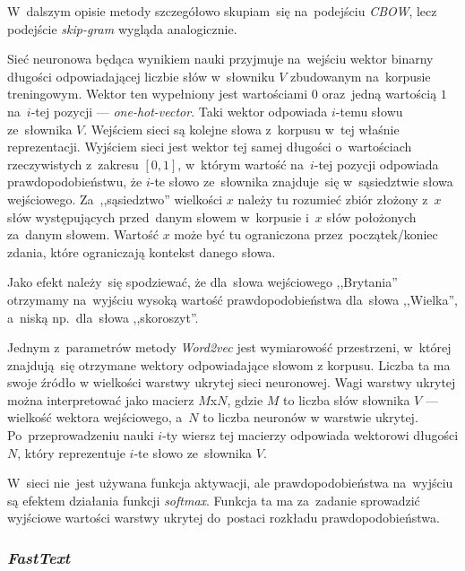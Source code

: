 \documentclass[pl]{minipw} %
\begin{document}
W~dalszym opisie metody szczegółowo skupiam~się na~podejściu \textit{CBOW}, lecz podejście \textit{skip-gram} wygląda analogicznie.

Sieć neuronowa będąca wynikiem nauki przyjmuje na~wejściu wektor binarny długości odpowiadającej liczbie słów w~słowniku $V$ zbudowanym na~korpusie treningowym. Wektor ten wypełniony jest wartościami $0$ oraz~jedną wartością $1$ na~$i$-tej pozycji --- \textit{one-hot-vector}. Taki wektor odpowiada $i$-temu słowu ze~słownika $V$. Wejściem sieci są kolejne słowa z~korpusu w~tej właśnie reprezentacji. Wyjściem sieci jest wektor tej samej długości o~wartościach rzeczywistych z~zakresu $[0,1]$, w~którym wartość na~$i$-tej pozycji odpowiada prawdopodobieństwu, że $i$-te słowo ze~słownika znajduje~się w~sąsiedztwie słowa wejściowego. Za~,,sąsiedztwo'' wielkości $x$ należy tu rozumieć zbiór złożony z~$x$ słów występujących przed~danym słowem w~korpusie i~$x$ słów położonych za~danym słowem. Wartość $x$ może być tu ograniczona przez~początek/koniec zdania, które ograniczają kontekst danego słowa.

Jako efekt należy~się spodziewać, że dla~słowa wejściowego ,,Brytania'' otrzymamy na~wyjściu wysoką wartość prawdopodobieństwa dla~słowa ,,Wielka'', a~niską np.~dla~słowa ,,skoroszyt''.

Jednym z~parametrów metody \textit{Word2vec} jest wymiarowość przestrzeni, w~której znajdują~się otrzymane wektory odpowiadające słowom z korpusu. Liczba ta ma swoje źródło w wielkości warstwy ukrytej sieci neuronowej. Wagi warstwy ukrytej można interpretować jako macierz $M$x$N$, gdzie $M$ to liczba słów słownika $V$ --- wielkość wektora wejściowego, a~$N$ to liczba neuronów w warstwie ukrytej. Po~przeprowadzeniu nauki $i$-ty wiersz tej macierzy odpowiada wektorowi długości $N$, który reprezentuje $i$-te słowo ze~słownika $V$.

W~sieci nie~jest używana funkcja aktywacji, ale prawdopodobieństwa na~wyjściu są efektem działania funkcji \textit{softmax}. Funkcja ta ma za~zadanie sprowadzić wyjściowe wartości warstwy ukrytej do~postaci rozkładu prawdopodobieństwa. 


\subsubsection{\textit{FastText}}
\end{document}
